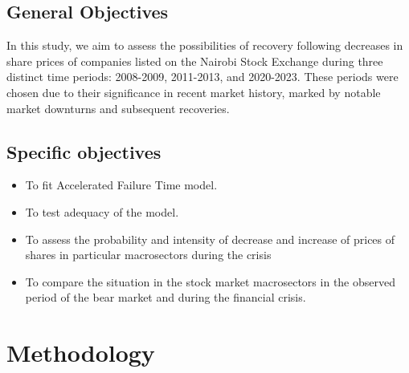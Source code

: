 \documentclass[twoside,a4paper,12pt]{article}
\begin{document}
\subsection*{General Objectives}In this study, we aim to assess the possibilities of recovery following decreases in share prices of companies listed on the Nairobi Stock Exchange during three distinct time periods: 2008-2009, 2011-2013, and 2020-2023. These periods were chosen due to their significance in recent market history, marked by notable market downturns and subsequent recoveries.
\subsection*{Specific objectives}
\begin{itemize}
	
	\item To fit   Accelerated Failure Time model.
	\item  To test adequacy of the model.
	\item To assess the probability and intensity of decrease and increase of 
prices of shares in particular macrosectors during the crisis 

	\item To compare the situation in the stock market macrosectors in the 
observed period of the bear market  and during the financial crisis.

	
	
	
\end{itemize}

\section*{Methodology} 
\end{document}
